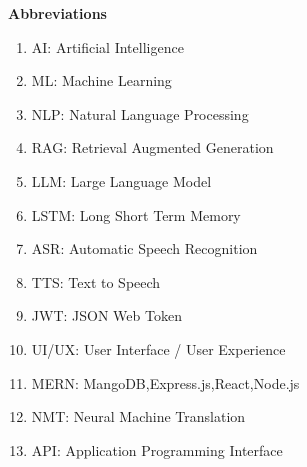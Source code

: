 \documentclass[12pt]{article}
\begin{document}
\begin{center}
    {\Large \bf Abbreviations}
\end{center}

\vspace{1em}

\begin{enumerate}
    \item AI: Artificial Intelligence
    \item ML: Machine Learning
    \item NLP: Natural Language Processing
    \item RAG: Retrieval Augmented Generation
    \item LLM: Large Language Model
    \item LSTM: Long Short Term Memory 
    \item ASR: Automatic Speech Recognition
    \item TTS: Text to Speech
    \item JWT: JSON Web Token
    \item UI/UX: User Interface / User Experience
    \item MERN: MangoDB,Express.js,React,Node.js
    \item NMT:  Neural Machine Translation
    \item API: Application Programming Interface
    
    
\end{enumerate}
\end{document}
